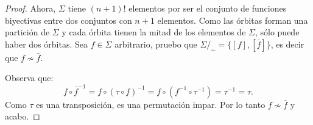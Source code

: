 \begin{proof}
  Ahora, $\Sigma$ tiene $(n+1)!$ elementos por ser el conjunto de funciones biyectivas entre dos
  conjuntos con $n+1$ elementos. Como las \'orbitas forman una partici\'on de $\Sigma$ y cada \'orbita
  tienen la mitad de los elementos de $\Sigma$, s\'olo puede haber dos \'orbitas. Sea $f\in\Sigma$
  arbitrario, pruebo que $\Sigma/_{\sim}=\{[f],[\bar{f}]\}$, es decir que $f\not\sim\bar{f}$.
  
  Observa que:
  \[
    f\circ\bar{f}^{-1}=f\circ(\tau\circ f)^{-1}=f\circ (f^{-1}\circ\tau^{-1})=\tau^{-1}=\tau.
  \]
  Como $\tau$ es una transposici\'on, es una permutaci\'on impar. Por lo tanto $f\not\sim \bar{f}$
  y acabo. 
\end{proof}%
